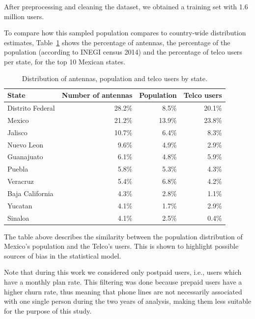 After preprocessing and cleaning the dataset, we obtained
a training set with 1.6 million users.

To compare how this sampled population compares to country-wide distribution estimates,
Table~\cref{tab:distribution_by_state} shows the percentage of antennas, the percentage of the population (according to INEGI census 2014) and
the percentage of telco users per state, for the top 10 Mexican states.


\begin{table}[ht]
	\caption{Distribution of antennas, population and telco users by state.}
	\label{tab:distribution_by_state}
	\centering
	\begin{tabular}{l r r r}
		\toprule
		State				& Number of antennas & Population 	& Telco users \\
		\midrule
		Distrito Federal      & 28.2\% 	& 8.5\%		& 20.1\%   \\
		Mexico                     & 21.2\%		&   13.9\% 	& 23.8\%   \\
		Jalisco                   & 10.7\% 	& 6.4\%		& 8.3\%    \\
		Nuevo Leon               & 9.6\%	& 4.9\%		& 2.9\% \\
		Guanajuato               & 6.1\%	& 4.8\%		& 5.9\% \\
		Puebla                     & 5.8\%	& 5.3\%		& 4.3\% \\
		Veracruz                  & 5.4\% 	& 6.8\%		& 4.2\% \\
		Baja California       & 4.3\%	& 2.8\%		& 1.1\% \\
		Yucatan                   & 4.1\%	& 1.7\%		& 2.9\% \\
		Sinaloa                   & 4.1\%	& 2.5\%		& 0.4\% \\
		\bottomrule
	\end{tabular}
\end{table}

The table above describes the similarity between the population distribution of Mexico's population and the Telco's users. This is shown to highlight possible sources of bias in the statistical model.

Note that during this work we considered only postpaid users, i.e., users which have a monthly plan rate. This filtering was done because prepaid users have a higher churn rate, thus meaning that phone lines are not necessarily associated with one single person during the two years of analysis, making them less suitable for the purpose of this study.

